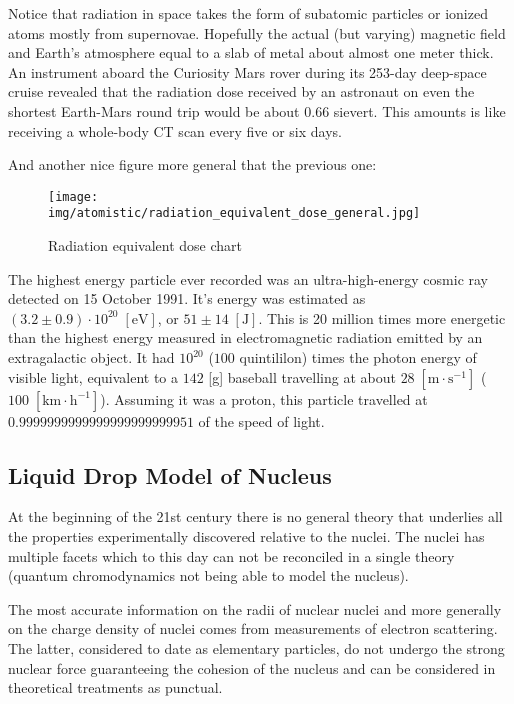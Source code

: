 	\begin{tcolorbox}[title=Remark,colframe=black,arc=10pt]
	Notice that radiation in space takes the form of subatomic particles or ionized atoms mostly from supernovae. Hopefully the actual (but varying) magnetic field and Earth's atmosphere equal to a slab of metal about almost one meter thick. An instrument aboard the Curiosity Mars rover during its 253-day deep-space cruise revealed that the radiation dose received by an astronaut on even the shortest Earth-Mars round trip would be about $0.66$ sievert. This amounts is like receiving a whole-body CT scan every five or six days.
	\end{tcolorbox}
	
	And another nice figure more general that the previous one:
	\begin{figure}[H]
		\centering
		\texttt{[image: img/atomistic/radiation\_equivalent\_dose\_general.jpg]}
		\caption{Radiation equivalent dose chart}
	\end{figure}
	
	\begin{tcolorbox}[title=Remark,colframe=black,arc=10pt]
	The highest energy particle ever recorded was an ultra-high-energy cosmic ray detected on 15 October 1991. It's energy was estimated as $(3.2 \pm 0.9) \cdot 10^{20}\; [\text{eV}]$, or $51 \pm 14\; [\text{J}]$. This is 20 million times more energetic than the highest energy measured in electromagnetic radiation emitted by an extragalactic object. It had $10^{20}$ ($100$ quintililon) times the photon energy of visible light, equivalent to a $142$ [g] baseball travelling at about $28\;[\text{m}\cdot\text{s}^{-1}]$ ($100 \;[\text{km}\cdot\text{h}^{-1}]$). Assuming it was a proton, this particle travelled at $0.9999999999999999999999951$ of the speed of light.
	\end{tcolorbox}
	
	\pagebreak
	\subsection{Liquid Drop Model of Nucleus}\label{liquid drop model}
	At the beginning of the 21st century there is no general theory that underlies all the properties experimentally discovered relative to the nuclei. The nuclei has multiple facets which to this day can not be reconciled in a single theory (quantum chromodynamics not being able to model the nucleus).

	The most accurate information on the radii of nuclear nuclei and more generally on the charge density of nuclei comes from measurements of electron scattering. The latter, considered to date as elementary particles, do not undergo the strong nuclear force guaranteeing the cohesion of the nucleus and can be considered in theoretical treatments as punctual.

